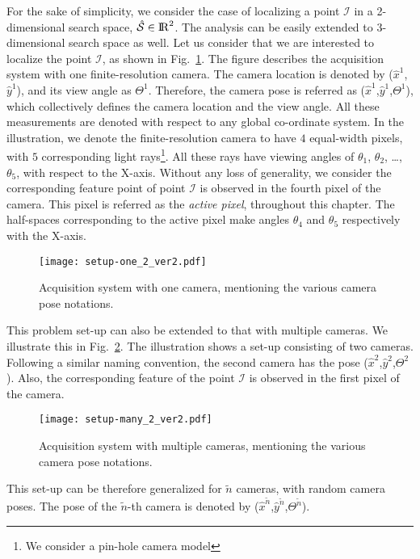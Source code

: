 For the sake of simplicity, we consider the case of localizing a point $\mathcal{I}$ in a 2-dimensional search space, $\hat{\mathcal{S}} \in {\rm I\!R}^{2}$. The analysis can be easily extended to 3-dimensional search space as well. Let us consider that we are interested to localize the point $\mathcal{I}$, as shown in Fig.~\ref{fig:setup-one}. The figure describes the acquisition system with one finite-resolution camera. The camera location is denoted by ($\hat{x}^1$,$\hat{y}^1$), and its view angle as $\Theta^1$. Therefore, the camera pose is referred as ($\hat{x}^1$,$\hat{y}^1$,$\Theta^1$), which collectively defines the camera location and the view angle. All these measurements are denoted with respect to any global co-ordinate system. In the illustration, we denote the finite-resolution camera to have $4$ equal-width pixels, with $5$ corresponding light rays\footnote{We consider a pin-hole camera model}. All these rays have viewing angles of $\theta_1$, $\theta_2$, \ldots , $\theta_5$, with respect to the X-axis. Without any loss of generality, we consider the corresponding feature point of point $\mathcal{I}$ is observed in the fourth pixel of the camera. This pixel is referred as the \emph{active pixel}, throughout this chapter. The half-spaces corresponding to the active pixel make angles $\theta_4$ and $\theta_5$ respectively with the X-axis.

\begin{figure}[htb]
\centering
{\texttt{[image: setup-one\_2\_ver2.pdf]}}
\caption{Acquisition system with one camera, mentioning the various camera pose notations.}
\label{fig:setup-one}
\end{figure}

This problem set-up can also be extended to that with multiple cameras. We illustrate this in Fig.~\ref{fig:setup-many}. The illustration shows a set-up consisting of two cameras. Following a similar naming convention, the second camera has the pose ($\hat{x}^2$,$\hat{y}^2$,$\Theta^2$). Also, the corresponding feature of the point $\mathcal{I}$ is observed in the first pixel of the camera.

\begin{figure}[htb]
\centering
{\texttt{[image: setup-many\_2\_ver2.pdf]}}
\caption{Acquisition system with multiple cameras, mentioning the various camera pose notations.}
\label{fig:setup-many}
\end{figure}

This set-up can be therefore generalized for $\tilde{n}$ cameras, with random camera poses. The pose of the $\tilde{n}$-th camera is denoted by ($\hat{x}^{\tilde{n}}$,$\hat{y}^{\tilde{n}}$,$\Theta^{\tilde{n}}$).

